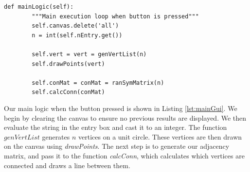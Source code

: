 \begin{lstlisting}[caption={Main GUI Button Logic}, label=lst:mainGui,firstnumber=33]
    def mainLogic(self):
        """Main execution loop when button is pressed"""
        self.canvas.delete('all')
        n = int(self.nEntry.get())
        
        self.vert = vert = genVertList(n)
        self.drawPoints(vert)
        
        self.conMat = conMat = ranSymMatrix(n)
        self.calcConn(conMat)
\end{lstlisting}\noindent
Our main logic when the button pressed is shown in Listing \ref{lst:mainGui}. We begin by clearing the canvas to ensure no previous results are displayed. We then evaluate the string in the entry box and cast it to an integer. The function $genVertList$ generates $n$ vertices on a unit circle. These vertices are then drawn on the canvas using \emph{drawPoints}. The next step is to generate our adjacency matrix, and pass it to the function \emph{calcConn}, which calculates which vertices are connected and draws a line between them.


